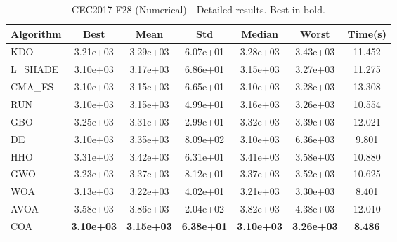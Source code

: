 \begin{table}[H]
\centering\small
\caption{CEC2017 F28 (Numerical) - Detailed results. Best in bold.}
\label{tab:cec2017_F28}
\begin{tabular}{lcccccc}
\toprule
\textbf{Algorithm} & \textbf{Best} & \textbf{Mean} & \textbf{Std} & \textbf{Median} & \textbf{Worst} & \textbf{Time(s)} \\
\midrule
KDO & 3.21e+03 & 3.29e+03 & 6.07e+01 & 3.28e+03 & 3.43e+03 & 11.452 \\
L_SHADE & 3.10e+03 & 3.17e+03 & 6.86e+01 & 3.15e+03 & 3.27e+03 & 11.275 \\
CMA_ES & 3.10e+03 & 3.15e+03 & 6.65e+01 & 3.10e+03 & 3.28e+03 & 13.308 \\
RUN & 3.10e+03 & 3.15e+03 & 4.99e+01 & 3.16e+03 & 3.26e+03 & 10.554 \\
GBO & 3.25e+03 & 3.31e+03 & 2.99e+01 & 3.32e+03 & 3.39e+03 & 12.021 \\
DE & 3.10e+03 & 3.35e+03 & 8.09e+02 & 3.10e+03 & 6.36e+03 & 9.801 \\
HHO & 3.31e+03 & 3.42e+03 & 6.31e+01 & 3.41e+03 & 3.58e+03 & 10.880 \\
GWO & 3.23e+03 & 3.37e+03 & 8.12e+01 & 3.37e+03 & 3.52e+03 & 10.625 \\
WOA & 3.13e+03 & 3.22e+03 & 4.02e+01 & 3.21e+03 & 3.30e+03 & 8.401 \\
AVOA & 3.58e+03 & 3.86e+03 & 2.04e+02 & 3.82e+03 & 4.38e+03 & 12.010 \\
COA & \textbf{3.10e+03} & \textbf{3.15e+03} & \textbf{6.38e+01} & \textbf{3.10e+03} & \textbf{3.26e+03} & \textbf{8.486} \\
\bottomrule
\end{tabular}
\end{table}
